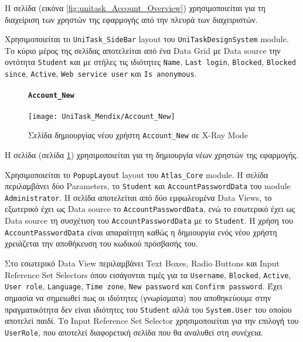                     Η σελίδα (εικόνα \ref{fig:unitask_Account_Overview}) χρησιμοποιείται για τη διαχείριση των χρηστών της εφαρμογής από την πλευρά των διαχειριστών.

                    Χρησιμοποιείται το \texttt{UniTask\_SideBar} layout του \texttt{UniTaskDesignSystem} module. Το κύριο μέρος της σελίδας αποτελείται από ένα Data Grid με Data source την οντότητα \texttt{Student} και με στήλες τις ιδιότητες \texttt{Name}, \texttt{Last login}, \texttt{Blocked}, \texttt{Blocked since}, \texttt{Active}, \texttt{Web service user} και \texttt{Is anonymous}.

                \newpage

                \begin{figure}[H] \noindent
                    \paragraph{\texttt{Account\_New}}
                    \begin{center}
                        \texttt{[image: UniTask\_Mendix/Account\_New]}
                        \caption{\centering Σελίδα δημιουργίας νέου χρήστη \texttt{Account\_New} σε X-Ray Mode}
                        \label{fig:unitask_Account_New}
                    \end{center}
                \end{figure}

                    Η σελίδα (σελίδα \ref{fig:unitask_Account_New}) χρησιμοποιείται για τη δημιουργία νέων χρηστών της εφαρμογής.

                    Χρησιμοποιείται το \texttt{PopupLayout} layout του \texttt{Atlas\_Core} module. Η σελίδα περιλαμβάνει δύο Parameters, το \texttt{Student} και \texttt{AccountPasswordData} του module \linebreak \texttt{Administrator}. Η σελίδα αποτελείται από δύο εμφωλευμένα Data Views, το εξωτερικό έχει ως Data source το \texttt{AccountPasswordData}, ενώ το εσωτερικό έχει ως Data source τη συσχέτιση του \texttt{AccountPasswordData} με το \texttt{Student}. Η χρήση του \texttt{AccountPasswordData} είναι απαραίτητη καθώς η δημιουργία ενός νέου χρήστη χρειάζεται την αποθήκευση του κωδικού πρόσβασής του.

                    Στο εσωτερικό Data View περιλαμβάνει Text Boxes, Radio Buttons και Input \linebreak Reference Set Selectors όπου εισάγονται τιμές για τα \texttt{Username}, \texttt{Blocked}, \texttt{Active}, \texttt{User role}, \texttt{Language}, \texttt{Time zone}, \texttt{New password} και \texttt{Confirm password}. Έχει σημασία να σημειωθεί πως οι ιδιότητες (γνωρίσματα) που αποθηκεύουμε στην πραγματικότητα δεν είναι ιδιότητες του \texttt{Student} αλλά του \texttt{System.User} του οποίου αποτελεί παιδί. Το Input Reference Set Selector χρησιμοποιείται για την επιλογή του \texttt{UserRole}, που αποτελεί διαφορετική σελίδα που θα αναλυθεί στη συνέχεια.

